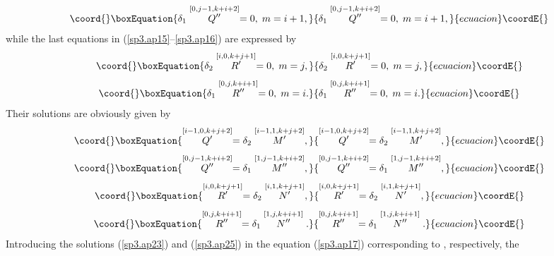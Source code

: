 \documentclass[a4paper,12pt]{article}
\begin{document}
\begin{equation}\coord{}\boxEquation{
\delta _{1}\stackrel{[0,j-1,k+i+2]}{Q^{\prime \prime }}=0,\;m=i+1,
\label{sp3.ap20}
}{
\delta _{1}\stackrel{[0,j-1,k+i+2]}{Q^{\prime \prime }}=0,\;m=i+1,
}{ecuacion}\coordE{}\end{equation}
while the last equations in (\ref{sp3.ap15}--\ref{sp3.ap16}) are expressed
by 
\begin{equation}\coord{}\boxEquation{
\delta _{2}\stackrel{[i,0,k+j+1]}{R^{\prime }}=0,\;m=j,  \label{sp3.ap21}
}{
\delta _{2}\stackrel{[i,0,k+j+1]}{R^{\prime }}=0,\;m=j,  }{ecuacion}\coordE{}\end{equation}
\begin{equation}\coord{}\boxEquation{
\delta _{1}\stackrel{[0,j,k+i+1]}{R^{\prime \prime }}=0,\;m=i.
\label{sp3.ap22}
}{
\delta _{1}\stackrel{[0,j,k+i+1]}{R^{\prime \prime }}=0,\;m=i.
}{ecuacion}\coordE{}\end{equation}
Their solutions are obviously given by 
\begin{equation}\coord{}\boxEquation{
\stackrel{\lbrack i-1,0,k+j+2]}{Q^{\prime }}=\delta _{2}\stackrel{
[i-1,1,k+j+2]}{M^{\prime }},  \label{sp3.ap23}
}{
\stackrel{\lbrack i-1,0,k+j+2]}{Q^{\prime }}=\delta _{2}\stackrel{
[i-1,1,k+j+2]}{M^{\prime }},  }{ecuacion}\coordE{}\end{equation}
\begin{equation}\coord{}\boxEquation{
\stackrel{\lbrack 0,j-1,k+i+2]}{Q^{\prime \prime }}=\delta _{1}\stackrel{
[1,j-1,k+i+2]}{M^{\prime \prime }},  \label{sp3.ap24}
}{
\stackrel{\lbrack 0,j-1,k+i+2]}{Q^{\prime \prime }}=\delta _{1}\stackrel{
[1,j-1,k+i+2]}{M^{\prime \prime }},  }{ecuacion}\coordE{}\end{equation}
\begin{equation}\coord{}\boxEquation{
\stackrel{\lbrack i,0,k+j+1]}{R^{\prime }}=\delta _{2}\stackrel{[i,1,k+j+1]}{
N^{\prime }},  \label{sp3.ap25}
}{
\stackrel{\lbrack i,0,k+j+1]}{R^{\prime }}=\delta _{2}\stackrel{[i,1,k+j+1]}{
N^{\prime }},  }{ecuacion}\coordE{}\end{equation}
\begin{equation}\coord{}\boxEquation{
\stackrel{\lbrack 0,j,k+i+1]}{R^{\prime \prime }}=\delta _{1}\stackrel{
[1,j,k+i+1]}{N^{\prime \prime }}.  \label{sp3.ap26}
}{
\stackrel{\lbrack 0,j,k+i+1]}{R^{\prime \prime }}=\delta _{1}\stackrel{
[1,j,k+i+1]}{N^{\prime \prime }}.  }{ecuacion}\coordE{}\end{equation}
Introducing the solutions (\ref{sp3.ap23}) and (\ref{sp3.ap25}) in the
equation (\ref{sp3.ap17}) corresponding to \coordHE{}, respectively, the
\end{document}
